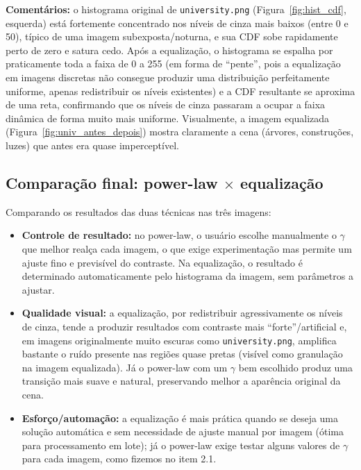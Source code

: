 \documentclass[10pt,twocolumn,letterpaper]{article}
\begin{document}
\textbf{Comentários:} o histograma original de \texttt{university.png}
(Figura~\ref{fig:hist_cdf}, esquerda) está fortemente concentrado nos níveis
de cinza mais baixos (entre 0 e 50), típico de uma imagem subexposta/noturna,
e sua CDF sobe rapidamente perto de zero e satura cedo. Após a
equalização, o histograma se espalha por praticamente toda a faixa de 0 a
255 (em forma de ``pente'', pois a equalização em imagens discretas não
consegue produzir uma distribuição perfeitamente uniforme, apenas
redistribuir os níveis existentes) e a CDF resultante se aproxima de uma
reta, confirmando que os níveis de cinza passaram a ocupar a faixa dinâmica
de forma muito mais uniforme. Visualmente, a imagem equalizada
(Figura~\ref{fig:univ_antes_depois}) mostra claramente a cena (árvores,
construções, luzes) que antes era quase imperceptível.

\subsection{Comparação final: power-law $\times$ equalização}

Comparando os resultados das duas técnicas nas três imagens:

\begin{itemize}
  \item \textbf{Controle de resultado:} no power-law, o usuário escolhe
  manualmente o $\gamma$ que melhor realça cada imagem, o que exige
  experimentação mas permite um ajuste fino e previsível do contraste. Na
  equalização, o resultado é determinado automaticamente pelo histograma da
  imagem, sem parâmetros a ajustar.
  \item \textbf{Qualidade visual:} a equalização, por redistribuir
  agressivamente os níveis de cinza, tende a produzir resultados com
  contraste mais ``forte''/artificial e, em imagens originalmente muito
  escuras como \texttt{university.png}, amplifica bastante o ruído presente
  nas regiões quase pretas (visível como granulação na imagem equalizada).
  Já o power-law com um $\gamma$ bem escolhido produz uma transição mais
  suave e natural, preservando melhor a aparência original da cena.
  \item \textbf{Esforço/automação:} a equalização é mais prática quando se
  deseja uma solução automática e sem necessidade de ajuste manual por
  imagem (ótima para processamento em lote); já o power-law exige testar
  alguns valores de $\gamma$ para cada imagem, como fizemos no item 2.1.
\end{itemize}
\end{document}
